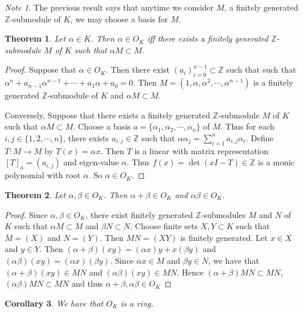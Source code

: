 \documentclass[12pt]{amsart}
\newtheorem{thm}{Theorem}[subsection]
\newtheorem{cor}[thm]{Corollary}
\theoremstyle{definition}
\theoremstyle{remark}
\newtheorem{note}[remark]{Note}
\theoremstyle{definition}
\newcommand{\al}{\alpha}
\newcommand{\Z}{\mathbb{Z}}
\begin{document}
\begin{note}
The previous result says that anytime we consider $M$, a finitely generated $\Z$-submodule of $K$, we may choose a basis for $M$. 
\end{note}

\begin{thm}
Let $\al \in K$. Then $\al \in O_K$ iff there exists a finitely generated $\Z$-submodule $M$ of $K$ such that $\al M \subset M$. 
\end{thm}

\begin{proof}
Suppose that $\al \in O_K$. Then there exist $(a_{i})_{i=0}^{n-1} \subset \Z$ such that such that $\al^n + a_{n-1}\al^{n-1}+ \cdots+a_1\al + a_0 = 0$. Then $M = (1, \al, \al^2, \cdots, \al^{n-1})$ is a finitely generated $\Z$-submodule of $K$ and $\al M \subset M$.

Conversely, Suppose that there exists a finitely generated $\Z$-submodule $M$ of $K$ such that $\al M \subset M$. Choose a basis $a=\{\al_1, \al_2, \cdots, \al_n\}$ of $M$. Thus for each $i,j \in \{1,2,\cdots, n\}$, there exists $a_{i,j} \in \Z$ such that $\al \al_j = \sum\limits_{i=1}^na_{i,j}\al_i$. Define $T:M \rightarrow M$ by $T(x) = \al x$. Then $T$ is a linear with matrix representation $[T]_a = (a_{i,j})$ and eigen-value $\al$. Thus $f(x) = \det(xI-T) \in \Z$ is a monic polynomial with root $\al$. So $\al \in O_K$.   
\end{proof}

\begin{thm}
Let $\al, \beta \in O_K$. Then $\al + \beta \in O_K$ and $\al \beta \in O_K$.
\end{thm}

\begin{proof}
Since $\al,\beta \in O_K$, there exist finitely generated $\Z$-submodules $M$ and $N$ of $K$ such that $\al M \subset M$ and $\beta N \subset N$. Choose finite sets $X,Y \subset K$ such that $M = (X)$ and $N=(Y)$. Then $MN = (XY)$ is finitely generated. Let $x \in X$ and $y \in Y$. Then $(\al+\beta)(xy) = (\al x)y+x(\beta y)$ and $(\al \beta)(xy) = (\al x)(\beta y)$. Since $\al x \in M$ and $\beta y \in N$, we have that $(\al+\beta)(xy) \in MN$ and $(\al \beta)(xy) \in MN$. Hence $(\al + \beta)MN \subset MN$, $(\al \beta)MN \subset MN$ and thus $\al+\beta, \al \beta \in O_K$
\end{proof}

\begin{cor}
We have that $O_K$ is a ring.
\end{cor}
\end{document}
